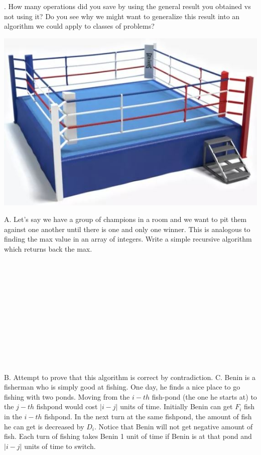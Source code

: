 \documentclass[12pt]{article}
\begin{document}
. How many operations did you save by using the general result you obtained vs not using it? Do you see why we might want to generalize this result into an algorithm we could apply to classes of problems?
\newpage
\centerline{\includegraphics[scale = 0.25]{boxing.jpg}}
\noindent A. Let's say we have a group of champions in a room and we want to pit them against one another until there is one and only one winner. This is analogous to finding the max value in an array of integers. Write a simple recursive algorithm which returns back the max.\\\\\\\\\\\\\\\\\\\\\\\\\\
\noindent B. Attempt to prove that this algorithm is correct by contradiction. 
\newpage
\noindent C. Benin is a fisherman who is simply good at fishing. One day, he finds a nice place to go fishing with two ponds. 
Moving from the $i-th$ fish-pond (the one he starts at) to the $j-th$ fishpond would cost $|i - j|$ units of time. 
Initially Benin can get $F_i$ fish in the $i-th$ fishpond. 
In the next turn at the same fishpond, the amount of fish he can get is decreased by $D_i$. 
Notice that Benin will not get negative amount of fish.
Each turn of fishing takes Benin 1 unit of time if Benin is at that pond and $|i - j|$ units of time to switch.
\\\\
\end{document}
